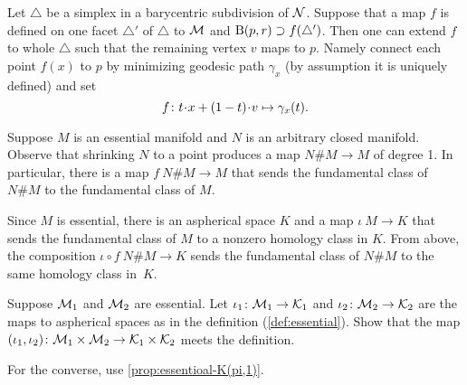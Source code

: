 Let $\triangle$ be a simplex in a barycentric subdivision of $\mathcal{N}$.
Suppose that a map $f$ is defined on one facet $\triangle'$ of $\triangle$ to $\mathcal{M}$ and $\mathrm{B}{}(p,r)\supset f(\triangle')$.
Then one can extend $f$ to whole $\triangle$ such that the remaining vertex $v$ maps to $p$.
Namely connect each point $f(x)$ to $p$ by minimizing geodesic path $\gamma_x$ (by assumption it is uniquely defined) and set
\[f
\:
t\cdot x\z+(1-t)\cdot v
\mapsto
\gamma_x(t).\]

Suppose $M$ is an essential manifold and $N$ is an arbitrary closed manifold.
Observe that shrinking $N$ to a point produces a map $N\#M\to M$ of degree 1.
In particular, there is a map $f\:N\#M\to M$ that sends the fundamental class of $N\#M$ to the fundamental class of $M$.

Since $M$ is essential, there is an aspherical space $K$ and a map $\iota\:M\to K$ that sends the fundamental class of $M$ to a nonzero homology class in $K$.
From above, the composition $\iota\circ f\:N\#M\to K$ sends the fundamental class of $N\#M$ to the same homology class in~$K$.


Suppose $\mathcal{M}_1$ and $\mathcal{M}_2$ are essential.
Let $\iota_1\colon\mathcal{M}_1\to\mathcal{K}_1$ and $\iota_2\colon\mathcal{M}_2\to\mathcal{K}_2$ are the maps to aspherical spaces as in the definition (\ref{def:essential}).
Show that the map
$(\iota_1,\iota_2)\colon\mathcal{M}_1\times\mathcal{M}_2\to\mathcal{K}_1\times\mathcal{K}_2$
meets the definition.

For the converse, use \ref{prop:essentioal-K(pi,1)}.

